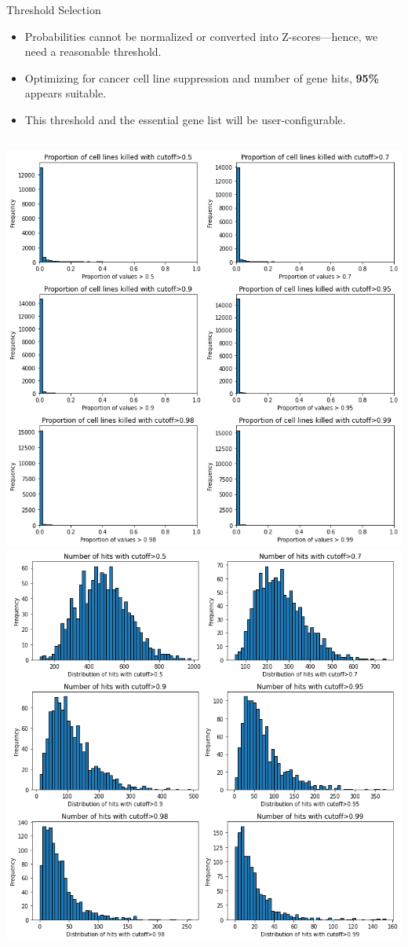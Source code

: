 \documentclass[handout]{beamer}
\begin{document}
\begin{frame}{Threshold Selection}
    \begin{itemize}
        \item Probabilities cannot be normalized or converted into Z-scores—hence, we need a reasonable threshold.
        \item Optimizing for cancer cell line suppression and number of gene hits, \textbf{95\%} appears suitable.
        \item This threshold and the essential gene list will be user-configurable.
    \end{itemize}
    \begin{columns}
        \centering
        \includegraphics[width=\linewidth]{percentage_cells_killed.png}
        \centering
        \includegraphics[width=\linewidth]{number_of_hits.png}

\end{columns}
\end{frame}
\end{document}
